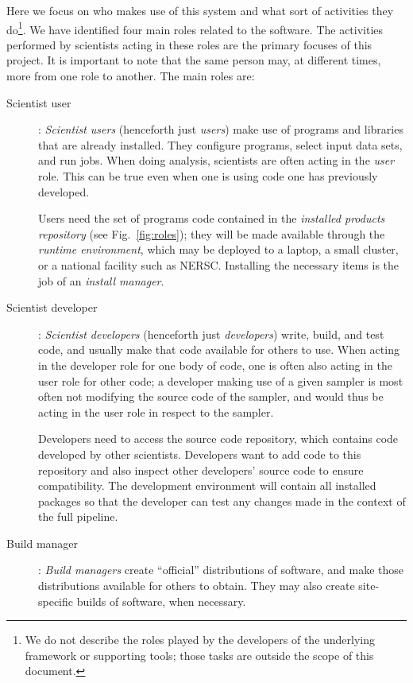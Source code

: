 \documentclass{memarticle}
\newcommand{\cosmosis}{\name{CosmoSIS}\xspace}
\begin{document}
Here we focus on who makes use of this system and what sort of
activities they do\footnote{We do not describe the roles played by the
  developers of the underlying framework or supporting tools; those
  tasks are outside the scope of this document.}. We have identified
four main roles related to the \cosmosis software. The activities
performed by scientists acting in these roles are the primary focuses of
this project. It is important to note that the same person may, at
different times, more from one role to another. The main roles are:
\begin{description}

\item[Scientist user]: \emph{Scientist users} (henceforth just
  \emph{users}) make use of programs and libraries that are already
  installed. They configure programs, select input data sets, and run
  jobs. When doing analysis, scientists are often acting in the
  \emph{user} role. This can be true even when one is using code one has
  previously developed.


  Users need the set of programs code contained in the \emph{installed
    products repository} (see Fig.~\ref{fig:roles}); they will be made
  available through the \emph{runtime environment}, which may be
  deployed to a laptop, a small cluster, or a national facility such as
  NERSC. Installing the necessary items is the job of an \emph{install
    manager}.

\item[Scientist developer]: \emph{Scientist developers} (henceforth just
  \emph{developers}) write, build, and test code, and usually make that
  code available for others to use. When acting in the developer role
  for one body of code, one is often also acting in the user role for
  other code; \eg a developer making use of a given sampler is most
  often not modifying the source code of the sampler, and would thus be
  acting in the user role in respect to the sampler.

Developers need to access the {source code repository}, which contains code developed by other scientists. Developers want to add code to this repository and also inspect other developers' source code to ensure compatibility. The {development environment} will contain all installed packages so that the developer can test any changes made in the context of the full pipeline.

\item[Build manager]: \emph{Build managers} create ``official''
  distributions of software, and make those distributions available for
  others to obtain. They may also create site-specific builds of
  software, when necessary. %



\end{description}
\end{document}
